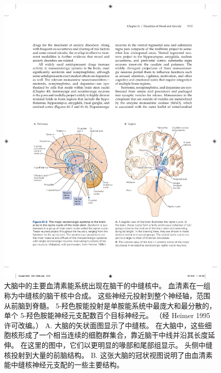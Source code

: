 \begin{figure}[htbp]
	\centering
	\includegraphics[width=0.95\linewidth]{chap61/fig_61_5}
	\caption{大脑中的主要血清素能系统出现在脑干的中缝核中。 血清素在一组称为中缝核的脑干核中合成。 这些神经元投射到整个神经轴，范围从前脑到脊髓。 5-羟色胺能投射是单胺能系统中最庞大和最分散的，单个 5-羟色胺能神经元支配数百个目标神经元。 （经 Heimer 1995 许可改编。） A. 大脑的矢状面图显示了中缝核。 在大脑中，这些细胞核形成了一个相当连续的细胞群集合，靠近脑干中线并沿其长度延伸。 在这里的图中，它们以更明显的喙部和尾部组显示。 头侧中缝核投射到大量的前脑结构。 B. 这张大脑的冠状视图说明了由血清素能中缝核神经元支配的一些主要结构。}
	\label{fig:61_5}
\end{figure}


